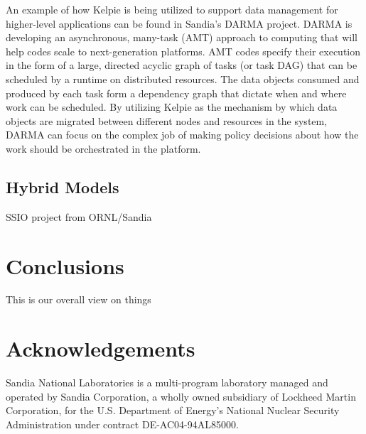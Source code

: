 An example of how Kelpie is being utilized to support data management for higher-level applications can be found in Sandia's DARMA project. DARMA is developing an asynchronous, many-task (AMT) approach to computing that will help codes scale to next-generation platforms. AMT codes specify their execution in the form of a large, directed acyclic graph of tasks (or task DAG) that can be scheduled by a runtime on distributed resources. The data objects consumed and produced by each task form a dependency graph that dictate when and where work can be scheduled. By utilizing Kelpie as the mechanism by which data objects are migrated between different nodes and resources in the system, DARMA can focus on the complex job of making policy decisions about how the work should be orchestrated in the platform.



\subsection{Hybrid Models}

SSIO project from ORNL/Sandia

\section{Conclusions}\label{sec:intro}

This is our overall view on things

\section*{Acknowledgements}
Sandia National Laboratories is a multi-program laboratory managed and operated
by Sandia Corporation, a wholly owned subsidiary of Lockheed Martin
Corporation, for the U.S. Department of Energy's National Nuclear Security
Administration under contract DE-AC04-94AL85000.




